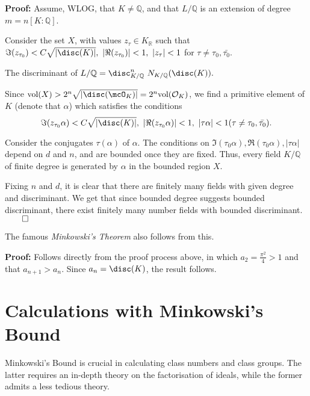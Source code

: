 \documentclass[a4paper, 12pt,oneside,openany]{book}
\begin{document}

\textbf{Proof:} Assume, WLOG, that $K\neq\mathbb{Q}$, and that $L/\mathbb{Q}$ is an extension of degree $m=n[K:\mathbb{Q}]$.

Consider the set $X$, with values $z_{\tau} \in K_{\mathbb{R}}$ such that $\Im(z_{\tau_0}) < C \sqrt{|\disc(K)|},\ |\Re(z_{\tau_0})|<1,\ |z_{\tau}|<1$ for $\tau \neq \tau_0, \bar{\tau_0}.$ 

The discriminant of $L/\mathbb{Q} = \disc_{K/\mathbb{Q}}^n\ N_{K/\mathbb{Q}}(\disc(K)).$ 

Since $\text{vol}(X) > 2^n \sqrt{|\disc(\mcO_K)|} = 2^n \text{vol}(\mathcal{O}_K)$, we find a primitive element of $K$ (denote that $\alpha$) which satisfies the conditions $$\Im(z_{\tau_0}\alpha) < C \sqrt{|\disc(K)|},\ |\Re(z_{\tau_0}\alpha)|<1,\ |\tau\alpha|<1 (\tau \neq \tau_0, \bar{\tau_0}).$$

Consider the conjugates $\tau(\alpha)$ of $\alpha$. The conditions on $\Im(\tau_0\alpha), \Re(\tau_0\alpha), |\tau\alpha|$ depend on $d$ and $n$, and are bounded once they are fixed. Thus, every field $K/\mathbb{Q}$ of finite degree is generated by $\alpha$ in the bounded region $X.$ 

Fixing $n$ and $d$, it is clear that there are finitely many fields with given degree and discriminant. We get that since bounded degree suggests bounded discriminant, there exist finitely many number fields with bounded discriminant. $\qed$

The famous \emph{Minkowski's Theorem} also follows from this.


\textbf{Proof:} Follows directly from the proof process above, in which $a_2=\frac{\pi^2}{4}>1$ and that $a_{n+1}>a_n.$ Since $a_n=\disc(K)$, the result follows.

\newpage

\section{Calculations with Minkowski's Bound}

Minkowski's Bound is crucial in calculating class numbers and class groups. The latter requires an in-depth theory on the factorisation of ideals, while the former admits a less tedious theory.
\end{document}
